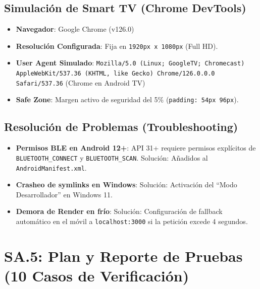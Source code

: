 \documentclass[11pt,a4paper]{article}
\begin{document}
\subsection{Simulación de Smart TV (Chrome DevTools)}
\begin{itemize}
    \item \textbf{Navegador}: Google Chrome (v126.0)
    \item \textbf{Resolución Configurada}: Fija en \texttt{1920px x 1080px} (Full HD).
    \item \textbf{User Agent Simulado}: \texttt{Mozilla/5.0 (Linux; GoogleTV; Chromecast) AppleWebKit/537.36 (KHTML, like Gecko) Chrome/126.0.0.0 Safari/537.36} (Chrome en Android TV)
    \item \textbf{Safe Zone}: Margen activo de seguridad del 5\% (\texttt{padding: 54px 96px}).
\end{itemize}

\subsection{Resolución de Problemas (Troubleshooting)}
\begin{itemize}
    \item \textbf{Permisos BLE en Android 12+}: API 31+ requiere permisos explícitos de \texttt{BLUETOOTH\_CONNECT} y \texttt{BLUETOOTH\_SCAN}. Solución: Añadidos al \texttt{AndroidManifest.xml}.
    \item \textbf{Crasheo de symlinks en Windows}: Solución: Activación del ``Modo Desarrollador'' en Windows 11.
    \item \textbf{Demora de Render en frío}: Solución: Configuración de fallback automático en el móvil a \texttt{localhost:3000} si la petición excede 4 segundos.
\end{itemize}

\newpage
\section{SA.5: Plan y Reporte de Pruebas (10 Casos de Verificación)}
\end{document}

